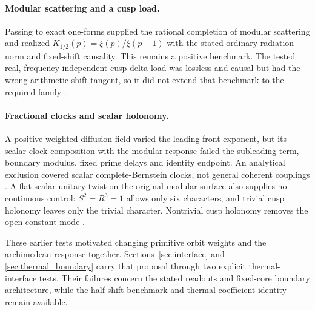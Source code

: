 \paragraph{Modular scattering and a cusp load.}
Passing to exact one-forms supplied the rational completion of modular
scattering and realized $K_{1/2}(p)=\xi(p)/\xi(p+1)$ with the stated
ordinary radiation norm and fixed-shift causality. This remains a
positive benchmark. The tested real, frequency-independent cusp delta
load was lossless and causal but had the wrong arithmetic shift
tangent, so it did not extend that benchmark to the required family
\cite{ModularNote}.

\paragraph{Fractional clocks and scalar holonomy.}
A positive weighted diffusion field varied the leading front exponent,
but its scalar clock composition with the modular response failed the
subleading term, boundary modulus, fixed prime delays and identity
endpoint. An analytical exclusion covered scalar complete-Bernstein
clocks, not general coherent couplings \cite{FractionalNote}. A flat
scalar unitary twist on the original modular surface also supplies no
continuous control: $S^2=R^3=1$ allows only six characters, and trivial
cusp holonomy leaves only the trivial character. Nontrivial cusp
holonomy removes the open constant mode \cite{OrbitNote}.

These earlier tests motivated changing primitive orbit weights and the
archimedean response together. Sections~\ref{sec:interface} and
\ref{sec:thermal_boundary} carry that proposal through two explicit
thermal-interface tests. Their failures concern the stated readouts and
fixed-core boundary architecture, while the half-shift benchmark and
thermal coefficient identity remain available.
